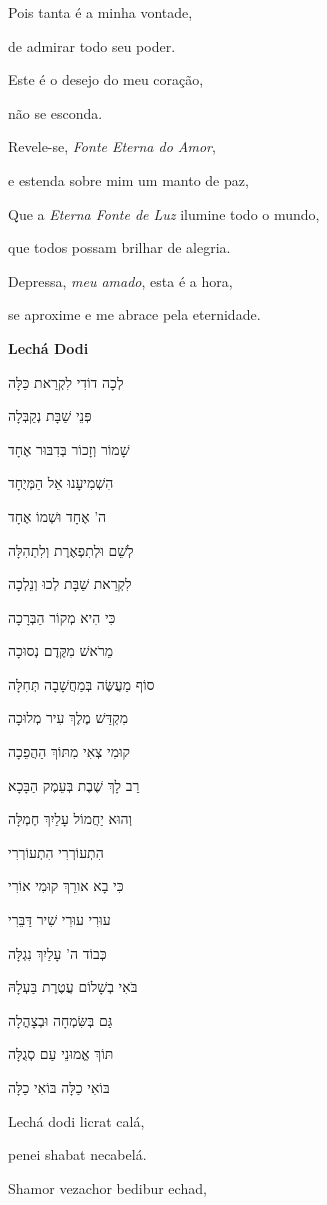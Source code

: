 Pois tanta é a minha vontade,

de admirar todo seu poder.

Este é o desejo do meu coração,

não se esconda.

Revele-se, \emph{Fonte Eterna do Amor},

e estenda sobre mim um manto de paz,

Que a \emph{Eterna Fonte de Luz} ilumine todo o mundo,

que todos possam brilhar de alegria.

Depressa, \emph{meu amado}, esta é a hora,

se aproxime e me abrace pela eternidade.

\textbf{Lechá Dodi}

לְכָה דוֹדִי לִקְרַאת כַּלָּה

פְּנֵי שַׁבָּת נְקַבְּלָה

שָׁמוֹר וְזָכוֹר בְּדִבּוּר אֶחָד

הִשְׁמִיעָנוּ אֵל הַמְּיֻחָד

ה' אֶחָד וּשְׁמוֹ אֶחָד

לְשֵׁם וּלְתִפְאֶרֶת וְלִתְהִלָּה

לִקְרַאת שַׁבָּת לְכוּ וְנֵלְכָה

כִּי הִיא מְקוֹר הַבְּרָכָה

מֵרֹאשׁ מִקֶּדֶם נְסוּכָה

סוֹף מַעֲשֶּׂה בְּמַחֲשָׁבָה תְּחִלָּה

מִקְדַּשׁ מֶלֶךְ עִיר מְלוּכָה

קוּמִי צְאִי מִתּוֹךְ הַהֲפֵכָה

רַב לָךְ שֶׁבֶת בְּעֵמֶק הַבָּכָא

וְהוּא יַחֲמוֹל עָלַיִךְ חֶמְלָּה

הִתְעוֹרְרִי הִתְעוֹרְרִי

כִּי בָא אורֵךְ קוּמִי אוֹרִי

עוּרִי עוּרִי שִׁיר דַּבֵּרִי

כְּבוֹד ה' עָלַיִךְ נִגְלָּה

בֹּאִי בְשָׁלוֹם עֲטֶרֶת בַּעְלָהּ

גַּם בְּשִּׂמְחָה וּבְצָהֳלָה

תּוֹךְ אֱמוּנֵי עַם סְגֻלָּה

בּוֹאִי כַלָּה בּוֹאִי כַלָּה

Lechá dodi licrat calá,

penei shabat necabelá.

Shamor vezachor bedibur echad,

